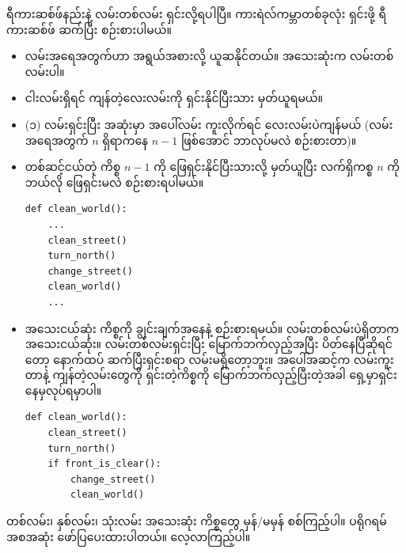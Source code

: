 ရီကားဆစ်ဖ်နည်းနဲ့ လမ်းတစ်လမ်း ရှင်းလို့ရပါပြီ။ ကားရဲလ်ကမ္ဘာတစ်ခုလုံး ရှင်းဖို့ ရီကားဆစ်ဖ် ဆက်ပြီး စဉ်းစားပါမယ်။ 
%
\begin{itemize}
    \item လမ်းအရေအတွက်ဟာ အရွယ်အစားလို့ ယူဆနိုင်တယ်။ အသေးဆုံးက လမ်းတစ်လမ်းပါ။
    \item ငါးလမ်းရှိရင် ကျန်တဲ့လေးလမ်းကို ရှင်းနိုင်ပြီးသား မှတ်ယူရမယ်။
    \item (၁) လမ်းရှင်းပြီး အဆုံးမှာ အပေါ်လမ်း ကူးလိုက်ရင် လေးလမ်းပဲကျန်မယ် (လမ်းအရေအတွက် $n$ ရှိရာကနေ   $n - 1$ ဖြစ်အောင် ဘာလုပ်မလဲ စဉ်းစားတာ)။
    \item တစ်ဆင့်ငယ်တဲ့ ကိစ္စ $n - 1$ ကို ဖြေရှင်းနိုင်ပြီးသားလို့ မှတ်ယူပြီး လက်ရှိကစ္စ $n$ ကို ဘယ်လို ဖြေရှင်းမလဲ စဉ်းစားရပါမယ်။
%
\setlength{\fboxsep}{0pt}
\begin{verbatim}
def clean_world():
    ...
    clean_street()
    turn_north()
    change_street()
    clean_world()
    ...
\end{verbatim}
%
    \item အသေးငယ်ဆုံး ကိစ္စကို ချွင်းချက်အနေနဲ့ စဉ်းစားရမယ်။   လမ်းတစ်လမ်းပဲရှိတာက အသေးငယ်ဆုံး။ လမ်းတစ်လမ်းရှင်းပြီး မြောက်ဘက်လှည့်အပြီး ပိတ်နေပြီဆိုရင်တော့ နောက်ထပ် ဆက်ပြီးရှင်းစရာ လမ်းမရှိတော့ဘူး။ အပေါ်အဆင့်က လမ်းကူးတာနဲ့ ကျန်တဲ့လမ်းတွေကို ရှင်းတဲ့ကိစ္စကို မြောက်ဘက်လှည့်ပြီးတဲ့အခါ ရှေ့မှာရှင်းနေမှလုပ်ရမှာပါ။
\setlength{\fboxsep}{0pt}
\begin{verbatim}
def clean_world():
    clean_street()
    turn_north()
    if front_is_clear():
        change_street()
        clean_world()
\end{verbatim}
%
\end{itemize}
%
တစ်လမ်း၊ နှစ်လမ်း၊ သုံးလမ်း အသေးဆုံး ကိစ္စတွေ မှန်/မမှန် စစ်ကြည့်ပါ။ ပရိုဂရမ် အစအဆုံး ဖော်ပြပေးထားပါတယ်။ လေ့လာကြည့်ပါ။
%
\setlength{\fboxsep}{0pt}
